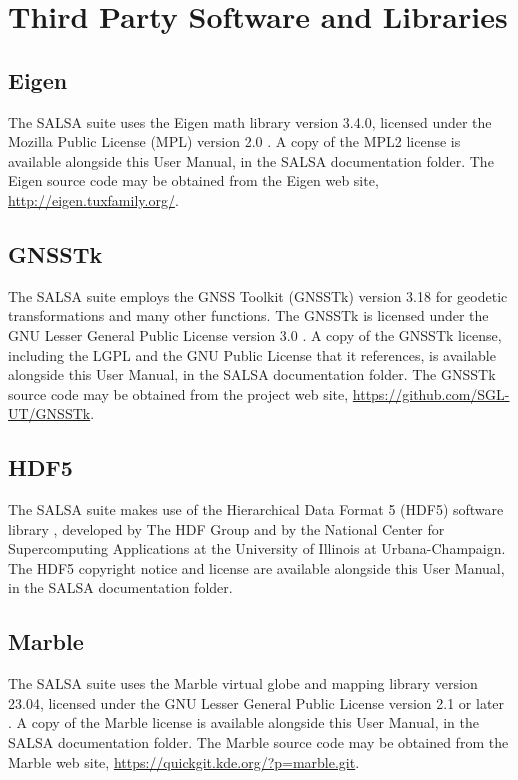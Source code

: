 \chapter{Third Party Software and Libraries}

\section*{Eigen}
The SALSA suite uses the Eigen math library \cite{eigenweb} version 3.4.0, licensed under the Mozilla Public License (MPL) version 2.0 \cite{MPL2}.  A copy of the MPL2 license is available alongside this User Manual, in the SALSA documentation folder.  The Eigen source code may be obtained from the Eigen web site, \url{http://eigen.tuxfamily.org/}.

\section*{GNSSTk}
The SALSA suite employs the GNSS Toolkit (GNSSTk) version 3.18 for geodetic transformations and many other functions.  The GNSSTk is licensed under the GNU Lesser General Public License version 3.0 \cite{LGPL}.  A copy of the GNSSTk license, including the LGPL and the GNU Public License that it references, is available alongside this User Manual, in the SALSA documentation folder.  The GNSSTk source code may be obtained from the project web site, \url{https://github.com/SGL-UT/GNSSTk}.

\section*{HDF5}
The SALSA suite makes use of the Hierarchical Data Format 5 (HDF5) software library \cite{hdf5}, developed by The HDF Group and by the National Center for Supercomputing Applications at the University of Illinois at Urbana-Champaign. The HDF5 copyright notice and license are available alongside this User Manual, in the SALSA documentation folder.

\section*{Marble}
The SALSA suite uses the Marble virtual globe and mapping library \cite{Marble} version 23.04, licensed under the GNU Lesser General Public License version 2.1 or later \cite{LGPL21}.  A copy of the Marble license is available alongside this User Manual, in the SALSA documentation folder. The Marble source code may be obtained from the Marble web site, \url{https://quickgit.kde.org/?p=marble.git}.

